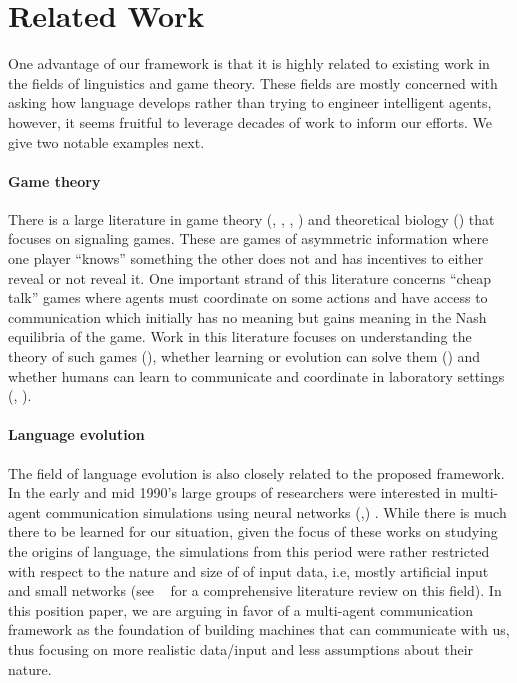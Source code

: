 \section{Related Work}
One advantage of our framework is that it is highly related to existing work in the fields of linguistics and game theory. These fields are mostly concerned with asking how language develops rather than trying to engineer intelligent agents, however, it seems fruitful to leverage decades of work to inform our efforts. We give two notable examples next.

\paragraph{Game theory}
There is a large literature in game theory (\cite{farrell:1996}, \cite{blume:1998experimental}, \cite{crawford:1998survey}, \cite{Skyrms:2010}) and theoretical biology (\cite{nowak:2006evolutionary}) that focuses on signaling games. These are games of asymmetric information where one player ``knows'' something the other does not and has incentives to either reveal or not reveal it. One important strand of this literature concerns ``cheap talk'' games where agents must coordinate on some actions and have access to communication which initially has no meaning but gains meaning in the Nash equilibria of the game. Work in this literature focuses on understanding the theory of such games (\cite{farrell:1996}), whether learning or evolution can solve them (\cite{nowak:2006evolutionary}) and whether humans can learn to communicate and coordinate in laboratory settings (\cite{crawford:1998survey}, \cite{blume:1998experimental}).

\paragraph{Language evolution}
The field of language evolution is also closely related to the proposed framework. In the early and mid 1990's large groups of researchers were interested in multi-agent communication simulations using neural networks (\cite{Kirby:Hurford:2002},\cite{Steels:2015}) . While there is much there to be learned for our situation, given the focus of these works on studying the origins of language, the simulations from this period were rather restricted with respect to the nature and size of of input data, i.e, mostly artificial input and small networks (see ~\cite{Wagner:etal:2003} for a  comprehensive literature review on this field). In this position paper, we are arguing in favor of a multi-agent communication framework as the foundation of building machines that can communicate with us, thus focusing on more realistic data/input and less assumptions about their nature. 